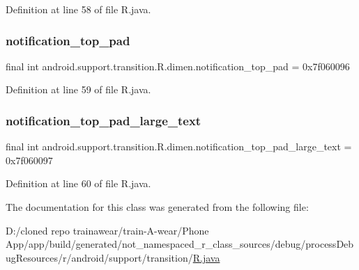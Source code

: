 Definition at line 58 of file R.\+java.

\mbox{\label{classandroid_1_1support_1_1transition_1_1_r_1_1dimen_a3ec428b9cec392b60627b804f667d059}} 
\subsubsection{\texorpdfstring{notification\_top\_pad}{notification\_top\_pad}}
{\footnotesize\ttfamily final int android.\+support.\+transition.\+R.\+dimen.\+notification\+\_\+top\+\_\+pad = 0x7f060096\hspace{0.3cm}{\ttfamily [static]}}



Definition at line 59 of file R.\+java.

\mbox{\label{classandroid_1_1support_1_1transition_1_1_r_1_1dimen_a473785d8fc51af681f93deb9a8fbc8b0}} 
\subsubsection{\texorpdfstring{notification\_top\_pad\_large\_text}{notification\_top\_pad\_large\_text}}
{\footnotesize\ttfamily final int android.\+support.\+transition.\+R.\+dimen.\+notification\+\_\+top\+\_\+pad\+\_\+large\+\_\+text = 0x7f060097\hspace{0.3cm}{\ttfamily [static]}}



Definition at line 60 of file R.\+java.



The documentation for this class was generated from the following file\+:\begin{DoxyCompactItemize}
\item 
D\+:/cloned repo trainawear/train-\/\+A-\/wear/\+Phone App/app/build/generated/not\+\_\+namespaced\+\_\+r\+\_\+class\+\_\+sources/debug/process\+Debug\+Resources/r/android/support/transition/\mbox{\hyperlink{process_debug_resources_2r_2android_2support_2transition_2_r_8java}{R.\+java}}\end{DoxyCompactItemize}
